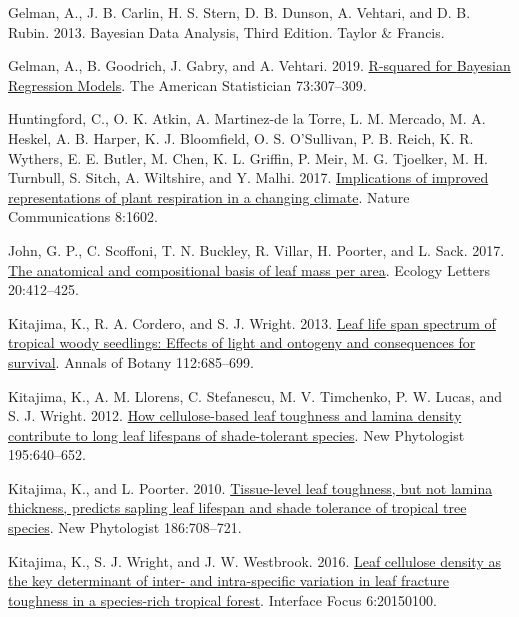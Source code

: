 \documentclass[
  12pt,
  a4paper,
,tablecaptionabove
]{scrartcl}
\newlength{\cslhangindent}
\newenvironment{CSLReferences}[2] %
 {%
  \setlength{\parindent}{0pt}
  \ifodd #1 \everypar{\setlength{\hangindent}{\cslhangindent}}\ignorespaces\fi
  \ifnum #2 > 0
  \setlength{\parskip}{#2\baselineskip}
  \fi
 }%
 {}
\begin{document}
\begin{CSLReferences}{1}{0}
\leavevmode{}%
Gelman, A., J. B. Carlin, H. S. Stern, D. B. Dunson, A. Vehtari, and D.
B. Rubin. 2013. Bayesian {Data Analysis}, {Third Edition}. {Taylor \&
Francis}.

\leavevmode{}%
Gelman, A., B. Goodrich, J. Gabry, and A. Vehtari. 2019.
\href{https://doi.org/10.1080/00031305.2018.1549100}{R-squared for
{Bayesian Regression Models}}. The American Statistician 73:307--309.

\leavevmode{}%
Huntingford, C., O. K. Atkin, A. Martinez-de la Torre, L. M. Mercado, M.
A. Heskel, A. B. Harper, K. J. Bloomfield, O. S. O'Sullivan, P. B.
Reich, K. R. Wythers, E. E. Butler, M. Chen, K. L. Griffin, P. Meir, M.
G. Tjoelker, M. H. Turnbull, S. Sitch, A. Wiltshire, and Y. Malhi. 2017.
\href{https://doi.org/10.1038/s41467-017-01774-z}{Implications of
improved representations of plant respiration in a changing climate}.
Nature Communications 8:1602.

\leavevmode{}%
John, G. P., C. Scoffoni, T. N. Buckley, R. Villar, H. Poorter, and L.
Sack. 2017. \href{https://doi.org/10.1111/ele.12739}{The anatomical and
compositional basis of leaf mass per area}. Ecology Letters 20:412--425.

\leavevmode{}%
Kitajima, K., R. A. Cordero, and S. J. Wright. 2013.
\href{https://doi.org/10.1093/aob/mct036}{Leaf life span spectrum of
tropical woody seedlings: {Effects} of light and ontogeny and
consequences for survival}. Annals of Botany 112:685--699.

\leavevmode{}%
Kitajima, K., A. M. Llorens, C. Stefanescu, M. V. Timchenko, P. W.
Lucas, and S. J. Wright. 2012.
\href{https://doi.org/10.1111/j.1469-8137.2012.04203.x}{How
cellulose-based leaf toughness and lamina density contribute to long
leaf lifespans of shade-tolerant species}. New Phytologist 195:640--652.

\leavevmode{}%
Kitajima, K., and L. Poorter. 2010.
\href{https://doi.org/10.1111/j.1469-8137.2010.03212.x}{Tissue-level
leaf toughness, but not lamina thickness, predicts sapling leaf lifespan
and shade tolerance of tropical tree species}. New Phytologist
186:708--721.

\leavevmode{}%
Kitajima, K., S. J. Wright, and J. W. Westbrook. 2016.
\href{https://doi.org/10.1098/rsfs.2015.0100}{Leaf cellulose density as
the key determinant of inter- and intra-specific variation in leaf
fracture toughness in a species-rich tropical forest}. Interface Focus
6:20150100.


\end{CSLReferences}
\end{document}
